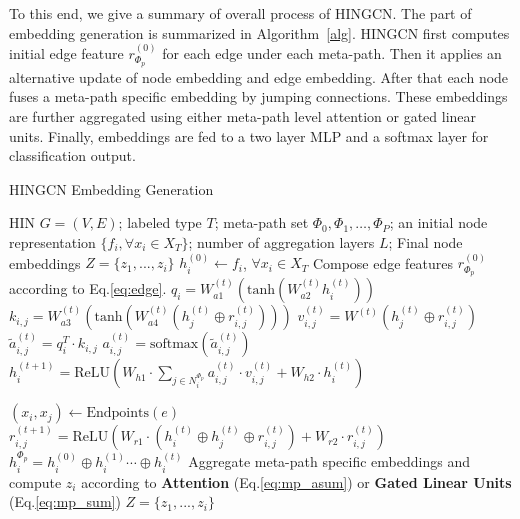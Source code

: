 To this end, we give a summary of overall process of HINGCN.
The part of embedding generation is summarized in Algorithm~\ref{alg}.
HINGCN first computes initial edge feature $r^{(0)}_{\Phi_p}$ for each edge under each meta-path. Then it applies an alternative update of node embedding and edge embedding.
After that each node fuses a meta-path specific embedding by jumping connections. These embeddings are further aggregated using either meta-path level attention or gated linear units. Finally, embeddings are fed to a two layer MLP and a softmax layer for classification output.

\begin{algorithm}
\caption{HINGCN Embedding Generation}
\label{alg}
\begin{algorithmic}[1]
\Require HIN $G=(V,E)$;
labeled type $T$;
meta-path set ${\Phi_0,\Phi_1,\ldots ,\Phi_P}$;
an initial node representation $\{ f_i,\forall x_i \in X_T \}$;
number of aggregation layers $L$;
\Ensure Final node embeddings $Z = \{z_1, ..., z_i\}$
\State $h^{(0)}_i \leftarrow f_i$, $\forall x_i \in X_T $
\State Compose edge features $r^{(0)}_{\Phi_p}$ according to Eq.\ref{eq:edge}.
\EndFor
{}
  \State $q_i= W_{a1}^{(t)}(\text{tanh}(W_{a2}^{(t)}h^{(t)}_i ))$
  \State $k_{i,j} = W_{a3}^{(t)}(\text{tanh}(W_{a4}^{(t)}(h^{(t)}_j \oplus r^{(t)}_{i,j}) ))$
  \State $v^{(t)}_{i,j} = W^{(t)}( h^{(t)}_j \oplus r^{(t)}_{i,j} )$
  \State $\tilde{a}^{(t)}_{i,j} = q_i^T \cdot k_{i,j}$
  \State $a^{(t)}_{i,j} = \text{softmax}(\tilde{a}^{(t)}_{i,j})$
 \EndFor
  \State $h^{(t+1)}_i = \text{ReLU}(W_{h1}\cdot \sum_{j\in N^{\Phi_p}_i} a^{(t)}_{i,j} \cdot v^{(t)}_{i,j}+ W_{h2}\cdot h^{(t)}_i) $
  \EndFor

  \State $(x_i,x_j) \leftarrow \text{Endpoints}(e)$
  \State $r^{(t+1)}_{i,j} = \text{ReLU}(W_{r1}\cdot (h^{(t)}_i \oplus h^{(t)}_j \oplus r^{(t)}_{i,j}) + W_{r2}\cdot r^{(t)}_{i,j})$
  \EndFor
 \EndFor
 \State $h^{\Phi_p}_i = h^{(0)}_i \oplus h^{(1)}_i \cdots \oplus h^{(t)}_i$
\EndFor
\State Aggregate meta-path specific embeddings and compute ${z}_i$ according to \textbf{Attention} (Eq.\ref{eq:mp_asum}) or \textbf{Gated Linear Units} (Eq.\ref{eq:mp_sum})
\State \Return $Z = \{z_1, ..., z_i\}$ 
\end{algorithmic}
\end{algorithm}









